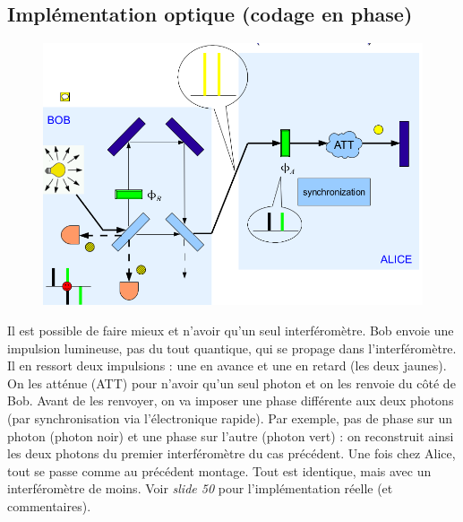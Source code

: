 \newpage
\subsection{Implémentation optique (codage en phase)}
	\begin{figure}
	\vspace{-5mm}
	\includegraphics[scale=0.2]{ch3/image13}
	\end{figure}
Il est possible de faire mieux et n'avoir qu'un seul interféromètre. Bob envoie une impulsion
lumineuse, pas du tout quantique, qui se propage dans l'interféromètre. Il en ressort deux 
impulsions : une en avance et une en retard (les deux jaunes). On les atténue (ATT) pour n'avoir
qu'un seul photon et on les renvoie du côté de Bob. Avant de les renvoyer, on va imposer une
phase différente aux deux photons (par synchronisation via l'électronique rapide). Par exemple, 
pas de phase sur un photon (photon noir) et une phase sur l'autre (photon vert) : on reconstruit 
ainsi les deux photons du premier interféromètre du cas précédent. Une fois chez Alice, tout se passe comme au précédent montage. Tout est identique, mais avec un interféromètre de moins. Voir 
\textit{slide 50} pour l'implémentation réelle (et commentaires).


